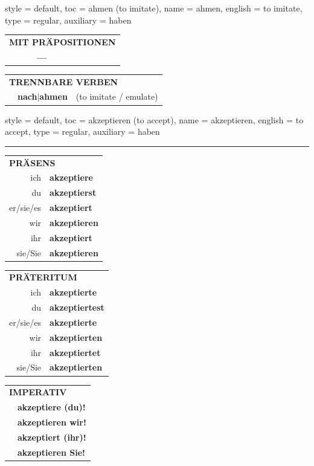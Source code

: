 \begin{verbentry}{
  style = {default},
  toc = {ahmen (to imitate)},
  name = {ahmen},
  english = {to imitate},
  type = {regular},
  auxiliary = {haben}
}
\vspace{10pt}

\begin{tabular}{lll}
\multicolumn{3}{l}{\textbf{MIT PRÄPOSITIONEN}}\\
& \textbf{---} & \\
\end{tabular}
\hfill
\begin{tabular}{lll}
\multicolumn{3}{l}{\textbf{TRENNBARE VERBEN}}\\
& \textbf{nach$|$ahmen} & (to imitate / emulate)\\
\end{tabular}
\vspace{-5pt}
\end{verbentry}

\begin{verbentry}{
  style = {default},
  toc = {akzeptieren (to accept)},
  name = {akzeptieren},
  english = {to accept},
  type = {regular},
  auxiliary = {haben}
}
 

\vspace{5pt}
\hrule
\vspace{5pt}

\begin{tabular}{rl}
\multicolumn{2}{l}{\textbf{PRÄSENS}}\\
ich & \textbf{akzeptiere}\\
du & \textbf{akzeptierst}\\
er/sie/es & \textbf{akzeptiert}\\
wir & \textbf{akzeptieren}\\
ihr & \textbf{akzeptiert}\\
sie/Sie & \textbf{akzeptieren}\\
\end{tabular}
\hfill
\begin{tabular}{rl}
\multicolumn{2}{l}{\textbf{PRÄTERITUM}}\\
ich & \textbf{akzeptierte}\\
du & \textbf{akzeptiertest}\\
er/sie/es & \textbf{akzeptierte}\\
wir & \textbf{akzeptierten}\\
ihr & \textbf{akzeptiertet}\\
sie/Sie & \textbf{akzeptierten}\\
\end{tabular}
\hfill
\begin{tabular}{rl}
\multicolumn{2}{l}{\textbf{IMPERATIV}}\\
& \textbf{akzeptiere (du)!}\\
& \textbf{akzeptieren wir!}\\
& \textbf{akzeptiert (ihr)!}\\
& \textbf{akzeptieren Sie!}\\
\end{tabular}


\end{verbentry}
